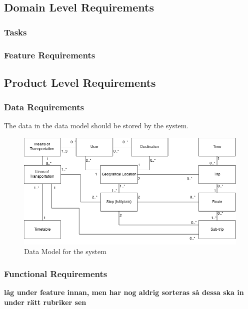 \documentclass[a4paper]{article}
\begin{document}
		\subsection{Domain Level Requirements}
			\subsubsection{Tasks}
				
			\subsubsection{Feature Requirements}
								
			
		\subsection{Product Level Requirements}		
			\subsubsection{Data Requirements}
				The data in the data model should be stored by the system.	
				\begin{figure}[h]
					\includegraphics[scale=0.50]{datamodel-v2.png}
					\caption{Data Model for the system}
				\end{figure}
				
				
				
			\subsubsection{Functional Requirements}
				
		
				\textbf{låg under feature innan, men har nog aldrig sorteras så dessa ska in under rätt rubriker sen}
			
\end{document}
